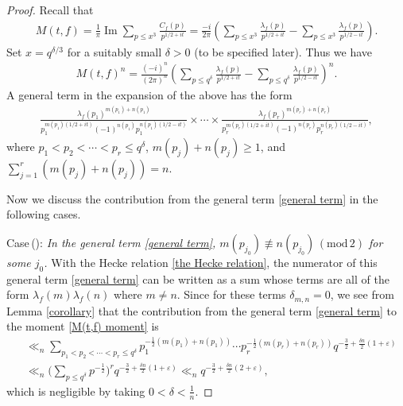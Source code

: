 \documentclass[11pt,reqno]{amsart}
\newcommand{\bea}{\begin{eqnarray}}
\newcommand{\eea}{\end{eqnarray}}
\newcommand{\bna}{\begin{eqnarray*}}
\newcommand{\ena}{\end{eqnarray*}}
\numberwithin{equation}{section}
\theoremstyle{plain}
\theoremstyle{definition}
\renewcommand{\Im}{\operatorname{Im}}
\renewcommand{\bmod}[1]{\,(\mathrm{mod\,}{#1})}
\begin{document}
\begin{proof}
Recall that
\bna
M(t,f)=\frac{1}{\pi}\Im\sum_{p\leq x^3}\frac{C_f(p)}{p^{1/2+it}}=
\frac{-i}{2\pi}\left(\sum_{p\leq x^3}\frac{\lambda_f(p)}{p^{1/2+it}}
-\sum_{p\leq x^3}\frac{\lambda_f(p)}{p^{1/2-it}}\right).
\ena
Set $x=q^{\delta/3}$ for a suitably small $\delta>0$ (to be specified later). Thus we have
\bna
M(t,f)^n=\frac{(-i)^n}{(2\pi)^n}\left(\sum_{p\leq q^{\delta}}\frac{\lambda_f(p)}{p^{1/2+it}}
-\sum_{p\leq q^{\delta}}\frac{\lambda_f(p)}{p^{1/2-it}}\right)^n.
\ena
A general term in the expansion of the above has the form
\bea\label{general term}
\frac{\lambda_f(p_1)^{m(p_1)+n(p_1)}}{p_1^{m(p_1)(1/2+it)}(-1)^{n(p_1)}p_1^{n(p_1)(1/2-it)}}
\times\cdots\times
\frac{\lambda_f(p_r)^{m(p_r)+n(p_r)}}{p_r^{m(p_r)(1/2+it)}(-1)^{n(p_r)}p_r^{n(p_r)(1/2-it)}},
\eea
where $p_1<p_2<\cdots<p_r\leq q^\delta$, $m(p_j)+n(p_j)\geq 1$, and $\sum_{j=1}^r(m(p_j)+n(p_j))=n$.

Now we discuss the contribution from the general term \eqref{general term} in the following cases.

Case\,(\uppercase\expandafter{}):
\emph{In the general term \eqref{general term}, $m(p_{j_0})\not\equiv n(p_{j_0})\bmod2$ for some $j_0$.}
With the Hecke relation \eqref{the Hecke relation}, the numerator of this general term \eqref{general term}
can be written as a sum whose terms are all of the form $\lambda_f(m)\lambda_f(n)$ where $m\neq n$.
Since for these terms $\delta_{m,n}=0$, we see from Lemma \ref{corollary} that the contribution from the general term
\eqref{general term} to the moment \eqref{M(t,f) moment} is
\begin{equation*}
\begin{split}
&\ll_n\sum_{p_1<p_2<\cdots<p_r\leq q^\delta}p_1^{-\frac{1}{2}(m(p_1)+n(p_1))}\cdots
p_r^{-\frac{1}{2}(m(p_r)+n(p_r))}q^{-\frac{3}{2}+\frac{\delta n}{2}(1+\varepsilon)}\\
&\ll_n\bigg(\sum_{p\leq q^\delta}p^{-\frac{1}{2}}\bigg)^rq^{-\frac{3}{2}+\frac{\delta n}{2}(1+\varepsilon)}
\ll_nq^{-\frac{3}{2}+\frac{\delta n}{2}(2+\varepsilon)},
\end{split}
\end{equation*}
which is negligible by taking $0<\delta<\frac{1}{n}$.


\end{proof}
\end{document}
